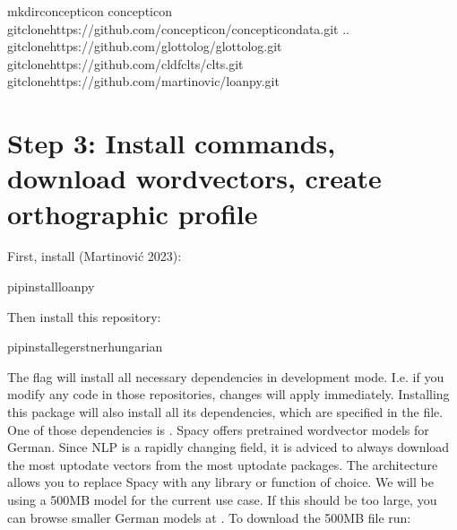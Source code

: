 \documentclass[letterpaper,10pt,english]{sphinxmanual}
\begin{document}
\begin{sphinxVerbatim}[commandchars=\\\{\}]
mkdirconcepticon
concepticon
gitclonehttps://github.com/concepticon/concepticon\PYGZhy{}data.git
..
gitclonehttps://github.com/glottolog/glottolog.git
gitclonehttps://github.com/cldf\PYGZhy{}clts/clts.git
gitclonehttps://github.com/martino\PYGZhy{}vic/loanpy.git
\end{sphinxVerbatim}


\section{Step 3: Install commands, download wordvectors, create orthographic profile}
\label{\detokenize{mkcldf:step-3-install-commands-download-wordvectors-create-orthographic-profile}}
\sphinxAtStartPar
First, install 
(Martinović 2023):

\begin{sphinxVerbatim}[commandchars=\\\{\}]
pipinstallloanpy
\end{sphinxVerbatim}

\sphinxAtStartPar
Then install this repository:

\begin{sphinxVerbatim}[commandchars=\\\{\}]
pipinstall\PYGZhy{}egerstnerhungarian
\end{sphinxVerbatim}

\sphinxAtStartPar
The  flag will install all necessary dependencies in development mode.
I.e. if you modify any code in those repositories, changes will apply
immediately.
Installing this package will also install all its dependencies,
which are specified in the  file. One of those
dependencies is
. Spacy offers pre\sphinxhyphen{}trained
wordvector models for German. Since NLP is a rapidly changing field, it is
adviced
to always download the most up\sphinxhyphen{}to\sphinxhyphen{}date vectors from the most up\sphinxhyphen{}to\sphinxhyphen{}date
packages. The architecture allows you to replace Spacy with any library
or function of choice. We will be using a 500MB model for the current
use case. If this should be too large, you can browse smaller German models at
. To download the 500MB file run:
\end{document}
